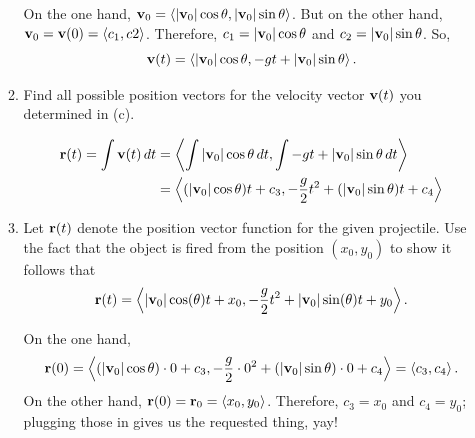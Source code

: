 \begin{enumerate}[leftmargin=0pt]
\begin{enumerate}
    \begin{red}
        On the one hand, $\mathbf{v}_0 = \left\langle |\mathbf{v}_0|\cos\theta, |\mathbf{v}_0|\sin\theta \right\rangle$. But on the other hand, $\mathbf{v}_0 = \mathbf{v}(0) = \left\langle c_1, c2 \right\rangle$. 
        Therefore, $c_1 = |\mathbf{v}_0|\cos\theta$ and $c_2 = |\mathbf{v}_0|\sin\theta$. So,
        \[\mathbf{v}(t) = \left\langle |\mathbf{v}_0|\cos\theta, -gt + |\mathbf{v}_0|\sin\theta \right\rangle.\]
    \end{red}
    \item Find all possible position vectors for the velocity vector $\mathbf{v}(t)$ you determined in (c).
    \begin{red}
        \begin{align*}
            \mathbf{r}(t) = \int \mathbf{v}(t)\, dt &= \left\langle \int |\mathbf{v}_0|\cos\theta\, dt, \int -gt + |\mathbf{v}_0|\sin\theta\,dt \right\rangle \\
            &= \left\langle
                (|\mathbf{v}_0|\cos\theta)t + c_3, 
                -\frac{g}{2} t^2 + (|\mathbf{v}_0|\sin\theta )t + c_4
            \right\rangle
        \end{align*}
    \end{red}
    \item Let $\mathbf{r}(t)$ denote the position vector function for the given projectile. Use the fact that the object is fired from the position $(x_0, y_0)$ to show it follows that
    \begin{equation*}
        \mathbf{r}(t) = \left\langle |\mathbf{v}_0| \cos(\theta)t + x_0, -\frac{g}{2}t^2 + |\mathbf{v}_0| \sin(\theta)t + y_0 \right\rangle.
    \end{equation*}
    
    \begin{red}
        On the one hand, 
        \[\mathbf{r}(0) = \left\langle
            (|\mathbf{v}_0|\cos\theta)\cdot 0 + c_3, 
            -\frac{g}{2}\cdot  0^2 + (|\mathbf{v}_0|\sin\theta )\cdot 0 + c_4
        \right\rangle = \left\langle c_3, c_4\right\rangle.\]
        On the other hand, $\mathbf{r}(0) = \mathbf{r}_0 = \left\langle x_0, y_0 \right\rangle$. 
        Therefore, $c_3 = x_0$ and $c_4 = y_0$; plugging those in gives us the requested thing, yay!
    \end{red}
\end{enumerate}


\end{enumerate}
